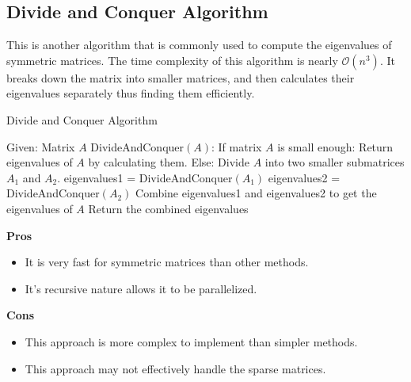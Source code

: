 \documentclass{article}
\begin{document}
\subsection{Divide and Conquer Algorithm}
This is another algorithm that is commonly used to compute the eigenvalues of symmetric matrices. The time complexity of this algorithm is nearly $\mathcal{O}(n^3)$. It breaks down the matrix into smaller matrices, and then calculates their eigenvalues separately thus finding them efficiently. 

\begin{algorithm}[H]
    \caption{Divide and Conquer Algorithm}
    \begin{algorithmic}[1]
        \Statex Given: Matrix $A$
        \State DivideAndConquer$(A)$:
        \State \hspace{1cm} If matrix $A$ is small enough:
        \State \hspace{2cm} Return eigenvalues of $A$ by calculating them.
        \State \hspace{1cm} Else:
        \State \hspace{2cm} Divide $A$ into two smaller submatrices $A_1$ and $A_2$.
        \State \hspace{2cm} eigenvalues1 = DivideAndConquer$(A_1)$ 
        \State \hspace{2cm} eigenvalues2 = DivideAndConquer$(A_2)$ 
        \State \hspace{2cm} Combine eigenvalues1 and eigenvalues2 to get the eigenvalues of $A$
        \State \hspace{2cm} Return the combined eigenvalues
    \end{algorithmic}
\end{algorithm}

\begin{multicols}{2}
\begin{center}\textbf{Pros}\end{center}
\begin{itemize}
    \item It is very fast for symmetric matrices than other methods.
    \item It's recursive nature allows it to be parallelized.
\end{itemize}
\columnbreak
\begin{center}\textbf{Cons}\end{center}
\begin{itemize}
    \item This approach is more complex to implement than simpler methods.
    \item This approach may not effectively handle the sparse matrices.
\end{itemize}
\end{multicols}
\end{document}

